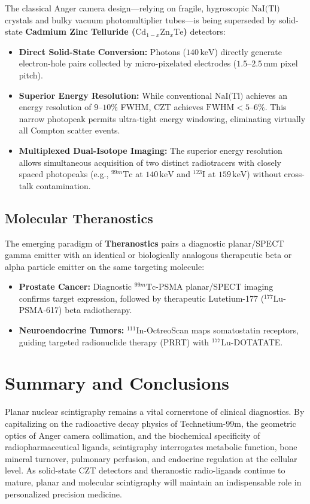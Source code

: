 \documentclass[11pt,a4paper]{article}
\begin{document}
The classical Anger camera design—relying on fragile, hygroscopic $\text{NaI(Tl)}$ crystals and bulky vacuum photomultiplier tubes—is being superseded by solid-state \textbf{Cadmium Zinc Telluride ($\text{Cd}_{1-x}\text{Zn}_x\text{Te}$)} detectors:
\begin{itemize}[leftmargin=*]
    \item \textbf{Direct Solid-State Conversion:} Photons ($140\,\text{keV}$) directly generate electron-hole pairs collected by micro-pixelated electrodes ($1.5\text{--}2.5\,\text{mm}$ pixel pitch).
    \item \textbf{Superior Energy Resolution:} While conventional $\text{NaI(Tl)}$ achieves an energy resolution of $9\text{--}10\%$ FWHM, CZT achieves \textbf{$\text{FWHM} < 5\text{--}6\%$}. This narrow photopeak permits ultra-tight energy windowing, eliminating virtually all Compton scatter events.
    \item \textbf{Multiplexed Dual-Isotope Imaging:} The superior energy resolution allows simultaneous acquisition of two distinct radiotracers with closely spaced photopeaks (e.g., $^{99m}\text{Tc}$ at $140\,\text{keV}$ and $^{123}\text{I}$ at $159\,\text{keV}$) without cross-talk contamination.
\end{itemize}

\subsection{Molecular Theranostics}

The emerging paradigm of \textbf{Theranostics} pairs a diagnostic planar/SPECT gamma emitter with an identical or biologically analogous therapeutic beta or alpha particle emitter on the same targeting molecule:
\begin{itemize}[leftmargin=*]
    \item \textbf{Prostate Cancer:} Diagnostic $^{99m}\text{Tc}$-PSMA planar/SPECT imaging confirms target expression, followed by therapeutic Lutetium-177 ($^{177}\text{Lu}$-PSMA-617) beta radiotherapy.
    \item \textbf{Neuroendocrine Tumors:} $^{111}\text{In}$-OctreoScan maps somatostatin receptors, guiding targeted radionuclide therapy (PRRT) with $^{177}\text{Lu}$-DOTATATE.
\end{itemize}

\section{Summary and Conclusions}

Planar nuclear scintigraphy remains a vital cornerstone of clinical diagnostics. By capitalizing on the radioactive decay physics of Technetium-99m, the geometric optics of Anger camera collimation, and the biochemical specificity of radiopharmaceutical ligands, scintigraphy interrogates metabolic function, bone mineral turnover, pulmonary perfusion, and endocrine regulation at the cellular level. As solid-state CZT detectors and theranostic radio-ligands continue to mature, planar and molecular scintigraphy will maintain an indispensable role in personalized precision medicine.
\end{document}
